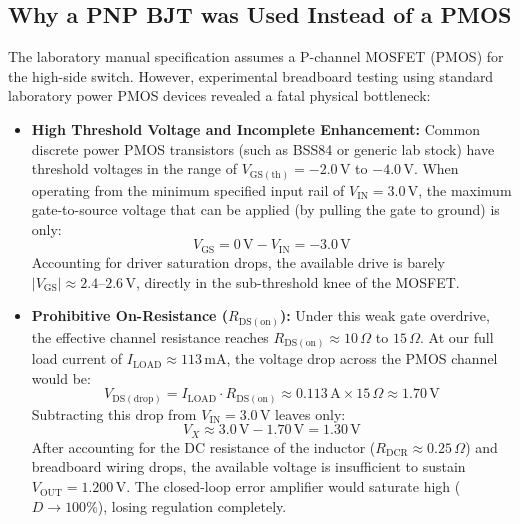 \documentclass[11pt,a4paper]{article}
\begin{document}
\subsection{Why a PNP BJT was Used Instead of a PMOS}
The laboratory manual specification assumes a P-channel MOSFET (PMOS) for the high-side switch. However, experimental breadboard testing using standard laboratory power PMOS devices revealed a fatal physical bottleneck:
\begin{itemize}
    \item \textbf{High Threshold Voltage and Incomplete Enhancement:} Common discrete power PMOS transistors (such as BSS84 or generic lab stock) have threshold voltages in the range of $V_{\mathrm{GS(th)}} = -2.0\,\mathrm{V}$ to $-4.0\,\mathrm{V}$. When operating from the minimum specified input rail of $V_{\mathrm{IN}} = 3.0\,\mathrm{V}$, the maximum gate-to-source voltage that can be applied (by pulling the gate to ground) is only:
    \begin{equation}
        V_{\mathrm{GS}} = 0\,\mathrm{V} - V_{\mathrm{IN}} = -3.0\,\mathrm{V}
    \end{equation}
    Accounting for driver saturation drops, the available drive is barely $|V_{\mathrm{GS}}| \approx 2.4\text{--}2.6\,\mathrm{V}$, directly in the sub-threshold knee of the MOSFET.
    \item \textbf{Prohibitive On-Resistance ($R_{\mathrm{DS(on)}}$):} Under this weak gate overdrive, the effective channel resistance reaches $R_{\mathrm{DS(on)}} \approx 10\,\Omega$ to $15\,\Omega$. At our full load current of $I_{\mathrm{LOAD}} \approx 113\,\mathrm{mA}$, the voltage drop across the PMOS channel would be:
    \begin{equation}
        V_{\mathrm{DS(drop)}} = I_{\mathrm{LOAD}} \cdot R_{\mathrm{DS(on)}} \approx 0.113\,\mathrm{A} \times 15\,\Omega \approx 1.70\,\mathrm{V}
    \end{equation}
    Subtracting this drop from $V_{\mathrm{IN}} = 3.0\,\mathrm{V}$ leaves only:
    \begin{equation}
        V_X \approx 3.0\,\mathrm{V} - 1.70\,\mathrm{V} = 1.30\,\mathrm{V}
    \end{equation}
    After accounting for the DC resistance of the inductor ($R_{\mathrm{DCR}} \approx 0.25\,\Omega$) and breadboard wiring drops, the available voltage is insufficient to sustain $V_{\mathrm{OUT}} = 1.200\,\mathrm{V}$. The closed-loop error amplifier would saturate high ($D \to 100\%$), losing regulation completely.
\end{itemize}
\end{document}
